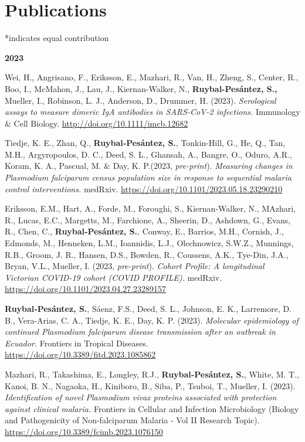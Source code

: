\documentclass[11pt,a4paper,]{awesome-cv}
\begin{document}
\hypertarget{publications}{%
\section{Publications}\label{publications}}

\footnotesize

*indicates equal contribution

\setlength{\leftskip}{0cm}

\textbf{2023}

\setlength{\leftskip}{1cm}

Wei, H., Angrisano, F., Eriksson, E., Mazhari, R., Van, H., Zheng, S.,
Center, R., Boo, I., McMahon, J., Lau, J., Kiernan-Walker, N.,
\textbf{Ruybal-Pesántez, S.,} Mueller, I., Robinson, L. J., Anderson,
D., Drummer, H. (2023). \emph{Serological assays to measure dimeric IgA
antibodies in SARS-CoV-2 infections.} Immunology \& Cell Biology.
\url{http://doi.org/10.1111/imcb.12682}

Tiedje, K. E., Zhan, Q., \textbf{Ruybal‐Pesántez, S.}, Tonkin-Hill, G.,
He, Q., Tan, M.H., Argyropoulos, D. C., Deed, S. L., Ghansah, A.,
Bangre, O., Oduro, A.R., Koram, K. A., Pascual, M. \& Day, K. P.(2023,
\emph{pre-print}). \emph{Measuring changes in Plasmodium falciparum
census population size in response to sequential malaria control
interventions.} medRxiv.
\url{https://doi.org/10.1101/2023.05.18.23290210}

Eriksson, E.M., Hart, A., Forde, M., Foroughi, S., Kiernan-Walker, N.,
MAzhari, R., Lucas, E.C., Margetts, M., Farchione, A., Sheerin, D.,
Ashdown, G., Evans, R., Chen, C., \textbf{Ruybal‐Pesántez, S.}, Conway,
E., Barrios, M.H., Cornish, J., Edmonds, M., Henneken, L.M., Ioannidis,
L.J., Olechnowicz, S.W.Z., Munnings, R.B., Groom, J. R., Hansen, D.S.,
Bowden, R., Coussens, A.K., Tye-Din, J.A., Bryan, V.L., Mueller, I.
(2023, \emph{pre-print}). \emph{Cohort Profile: A longitudinal Victorian
COVID-19 cohort (COVID PROFILE).} medRxiv.
\url{https://doi.org/10.1101/2023.04.27.23289157}

\textbf{Ruybal‐Pesántez, S.}, Sáenz, F.S., Deed, S. L., Johnson, E. K.,
Larremore, D. B., Vera-Arias, C. A., Tiedje, K. E., Day, K. P. (2023).
\emph{Molecular epidemiology of continued Plasmodium falciparum disease
transmission after an outbreak in Ecuador.} Frontiers in Tropical
Diseases. \url{https://doi.org/10.3389/fitd.2023.1085862}

Mazhari, R., Takashima, E., Longley, R.J., \textbf{Ruybal‐Pesántez, S.},
White, M. T., Kanoi, B. N., Nagaoka, H., Kiniboro, B., Siba, P., Tsuboi,
T., Mueller, I. (2023). \emph{Identification of novel Plasmodium vivax
proteins associated with protection against clinical malaria.} Frontiers
in Cellular and Infection Microbiology (Biology and Pathogenicity of
Non-falciparum Malaria - Vol II Research Topic).
\url{https://doi.org/10.3389/fcimb.2023.1076150}
\end{document}
